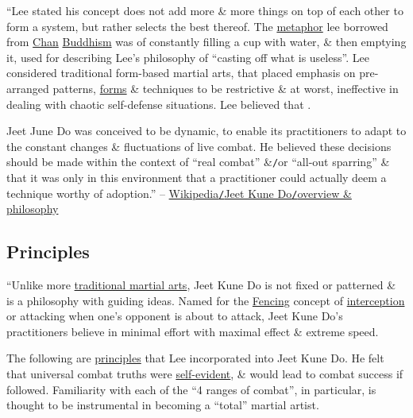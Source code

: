 \documentclass[oneside]{book}
\numberwithin{equation}{section}
\begin{document}
``Lee stated his concept does not add more \& more things on top of each other to form a system, but rather selects the best thereof. The \href{https://en.wikipedia.org/wiki/Metaphor}{metaphor} lee borrowed from \href{https://en.wikipedia.org/wiki/Zen}{Chan} \href{https://en.wikipedia.org/wiki/Buddhism}{Buddhism} was of constantly filling a cup with water, \& then emptying it, used for describing Lee's philosophy of ``casting off what is useless''. Lee considered traditional form-based martial arts, that placed emphasis on pre-arranged patterns, \href{https://en.wikipedia.org/wiki/Kata}{forms} \& techniques to be restrictive \& at worst, ineffective in dealing with chaotic self-defense situations. Lee believed that .

Jeet June Do was conceived to be dynamic, to enable its practitioners to adapt to the constant changes \& fluctuations of live combat. He believed these decisions should be made within the context of ``real combat'' \&\texttt{/}or ``all-out sparring'' \& that it was only in this environment that a practitioner could actually deem a technique worthy of adoption.'' -- \href{https://en.wikipedia.org/wiki/Jeet_Kune_Do#Overview_and_philosophy}{Wikipedia\texttt{/}Jeet Kune Do\texttt{/}overview \& philosophy}

\subsection{Principles}
``Unlike more \href{https://en.wikipedia.org/wiki/Traditional_martial_arts}{traditional martial arts}, Jeet Kune Do is not fixed or patterned \& is a philosophy with guiding ideas. Named for the \href{https://en.wikipedia.org/wiki/Fencing}{Fencing} concept of \href{https://en.wikipedia.org/wiki/Interception}{interception} or attacking when one's opponent is about to attack, Jeet Kune Do's practitioners believe in minimal effort with maximal effect \& extreme speed.

The following are \href{https://en.wikipedia.org/wiki/Principle}{principles} that Lee incorporated into Jeet Kune Do. He felt that universal combat truths were \href{https://en.wikipedia.org/wiki/Self-evident}{self-evident}, \& would lead to combat success if followed. Familiarity with each of the ``4 ranges of combat'', in particular, is thought to be instrumental in becoming a ``total'' martial artist.
\end{document}
